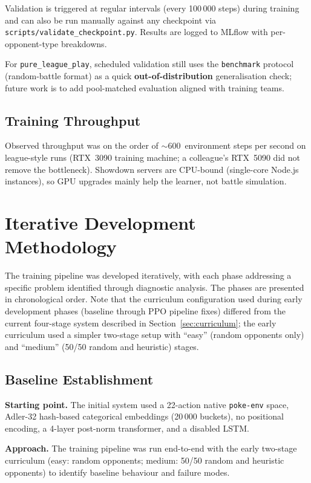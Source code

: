 Validation is triggered at regular intervals (every 100\,000 steps) during
training and can also be run manually against any checkpoint via
\texttt{scripts/validate\_checkpoint.py}.  Results are logged to MLflow with
per-opponent-type breakdowns.

For \texttt{pure\_league\_play}, scheduled validation still uses the
\texttt{benchmark} protocol (random-battle format) as a quick
\textbf{out-of-distribution} generalisation check; future work is to add
pool-matched evaluation aligned with training teams.

\subsection{Training Throughput}

Observed throughput was on the order of $\sim$600~environment steps per second
on league-style runs (RTX~3090 training machine; a colleague's RTX~5090 did not
remove the bottleneck).  Showdown servers are CPU-bound (single-core Node.js
instances), so GPU upgrades mainly help the learner, not battle simulation.

\section{Iterative Development Methodology}
\label{sec:dev_methodology}

The training pipeline was developed iteratively, with each phase addressing a
specific problem identified through diagnostic analysis.  The phases are
presented in chronological order.  Note that the curriculum configuration used
during early development phases (baseline through PPO pipeline fixes) differed
from the current four-stage system described in
Section~\ref{sec:curriculum}; the early curriculum used a simpler two-stage
setup with ``easy'' (random opponents only) and ``medium'' (50/50 random and
heuristic) stages.

\subsection{Baseline Establishment}

\textbf{Starting point.} The initial system used a 22-action native
\texttt{poke-env} space, Adler-32 hash-based categorical embeddings (20\,000
buckets), no positional encoding, a 4-layer post-norm transformer, and a
disabled LSTM.

\textbf{Approach.} The training pipeline was run end-to-end with the early
two-stage curriculum (easy: random opponents; medium: 50/50 random and
heuristic opponents) to identify baseline behaviour and failure modes.


